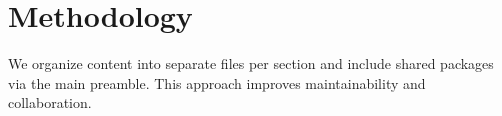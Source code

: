 \section{Methodology}
We organize content into separate files per section and include shared packages via the main preamble. This approach improves maintainability and collaboration.


